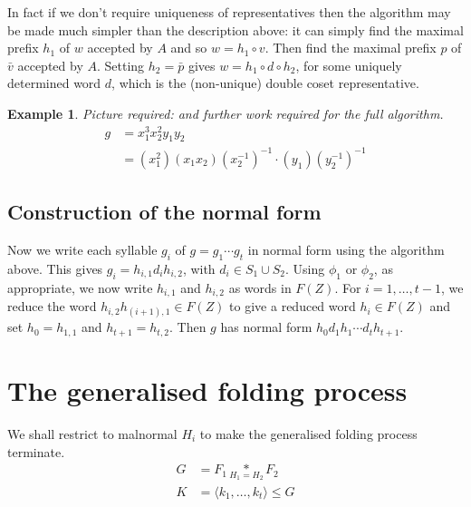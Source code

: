\documentclass[a4paper,12pt]{article}
\newtheorem{exam}[theorem]{Example}
\newenvironment{example}{\begin{exam} \rm}{\end{exam}}
\numberwithin{equation}{section}
\numberwithin{figure}{section}
\begin{document}
In fact if we don't require uniqueness of representatives then the algorithm 
may be made much simpler than the description above: it can 
simply find the maximal prefix $h_1$ of $w$  accepted  by $A$  and so $w=h_1\circ v$. Then find the
maximal prefix $p$ of $\bar v$ accepted by $A$. Setting $h_2=\bar p$ gives $w=h_1\circ d \circ h_2$, for
some uniquely determined word $d$, which is the (non-unique) 
double coset representative. 


\begin{example}
Picture required: and further work required for the full algorithm.
\begin{align*} 
g &= x_1^3x_2^2y_1y_2 \\ 
&= (x_1^2)(x_1x_2)(x_2^{-1})^{-1} \cdot (y_1)(y_2^{-1})^{-1}
\end{align*}
\end{example}

\subsection{Construction of the normal form}

Now we write each syllable $g_i$ of $g=g_1\cdots g_t$ in normal form using the algorithm above. 
This gives $g_i=h_{i,1}d_ih_{i,2}$, with $d_i\in S_1\cup S_2$. Using $\phi_1$ or $\phi_2$, as appropriate,
we now write $h_{i,1}$ and $h_{i,2}$ as words in $F(Z)$. For $i=1,\ldots , t-1$, we reduce the 
word $h_{i,2}h_{(i+1),1}\in F(Z)$ to give a reduced word $h_i\in F(Z)$ and set $h_0=h_{1,1}$ and  $h_{t+1}=h_{t,2}$.
Then $g$ has normal form $h_0d_1h_1\cdots d_th_{t+1}$. 
\section{The generalised folding process}
We shall restrict to malnormal $H_i$ to make the generalised folding process terminate.
\begin{align*} 
G &= F_1 \underset{H_1=H_2}{\ast}F_2 \\ 
K &= \langle k_1, \ldots, k_t \rangle \leqslant G
\end{align*}
%
%


\end{document}
